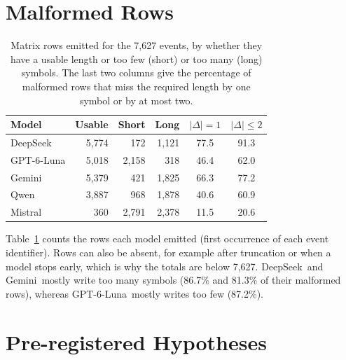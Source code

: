 \documentclass[11pt]{article}
\newcommand{\Ds}{DeepSeek}
\newcommand{\Gp}{GPT-6-Luna}
\newcommand{\Gm}{Gemini}
\newcommand{\Qw}{Qwen}
\newcommand{\Ms}{Mistral}
\begin{document}
\section{Malformed Rows}
\label{app:rows}

\begin{table}[!ht]
\centering
\small
\setlength{\tabcolsep}{3.5pt}
\begin{tabular}{l rrr cc}
\toprule
Model & Usable & Short & Long & $|\Delta|=1$ & $|\Delta|\leq 2$ \\
\midrule
\Ds & 5,774 & 172 & 1,121 & 77.5 & 91.3 \\
\Gp & 5,018 & 2,158 & 318 & 46.4 & 62.0 \\
\Gm & 5,379 & 421 & 1,825 & 66.3 & 77.2 \\
\Qw & 3,887 & 968 & 1,878 & 40.6 & 60.9 \\
\Ms & 360 & 2,791 & 2,378 & 11.5 & 20.6 \\
\bottomrule
\end{tabular}
\caption{Matrix rows emitted for the 7,627 events, by whether they have a usable length or too few (short) or too many (long) symbols. The last two columns give the percentage of malformed rows that miss the required length by one symbol or by at most two.}
\label{tab:rows}
\end{table}

Table~\ref{tab:rows} counts the rows each model emitted (first occurrence of each event identifier). Rows can also be absent, for example after truncation or when a model stops early, which is why the totals are below 7,627. \Ds\ and \Gm\ mostly write too many symbols (86.7\% and 81.3\% of their malformed rows), whereas \Gp\ mostly writes too few (87.2\%).

\section{Pre-registered Hypotheses}
\label{app:hyp}
\end{document}
